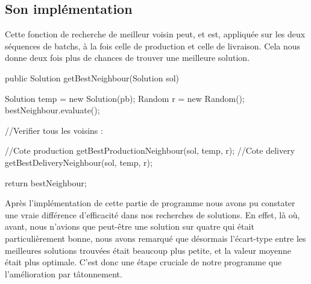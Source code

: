 \subsection{Son implémentation}
Cette fonction de recherche de meilleur voisin peut, et est, appliquée sur les deux séquences de batchs, à la fois celle de production et celle de livraison. Cela nous donne deux fois plus de chances de trouver une meilleure solution.

\begin{java}
public Solution getBestNeighbour(Solution sol) {
	Solution temp = new Solution(pb);
	Random r = new Random();
	bestNeighbour.evaluate();
	
	//Verifier tous les voisins :
	
	//Cote production
	getBestProductionNeighbour(sol, temp, r);
	//Cote delivery
	getBestDeliveryNeighbour(sol, temp, r);
	
	return bestNeighbour;
}
\end{java}

\vspace{1em}

Après l'implémentation de cette partie de programme nous avons pu constater une vraie différence d'efficacité dans nos recherches de solutions. En effet, là où, avant, nous n'avions que peut-être une solution sur quatre qui était particulièrement bonne, nous avons remarqué que désormais l'écart-type entre les meilleures solutions trouvées était beaucoup plus petite, et la valeur moyenne était plus optimale. C'est donc une étape cruciale de notre programme que l'amélioration par tâtonnement.